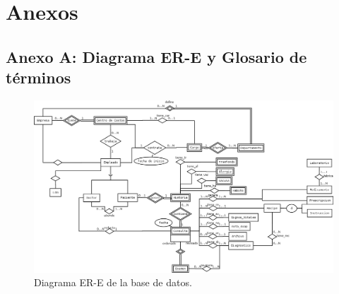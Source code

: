 \chapter*{Anexos}

\section*{Anexo A: Diagrama ER-E y Glosario de términos}

            \begin{figure}
                \begin{center}
                    \includegraphics[scale=.4,angle=90]{figures/DiagramBD}
                \end{center}
                \caption{Diagrama ER-E de la base de datos.}
            \end{figure}

\pagebreak